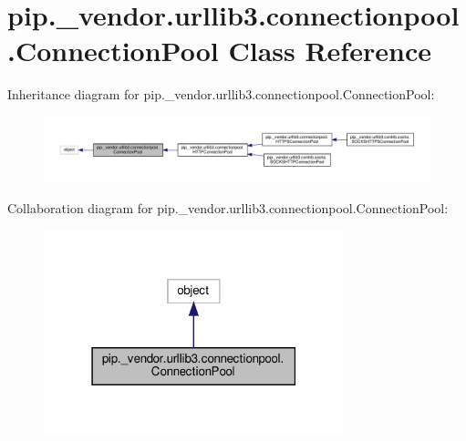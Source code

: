 \hypertarget{classpip_1_1__vendor_1_1urllib3_1_1connectionpool_1_1ConnectionPool}{}\section{pip.\+\_\+vendor.\+urllib3.\+connectionpool.\+Connection\+Pool Class Reference}
\label{classpip_1_1__vendor_1_1urllib3_1_1connectionpool_1_1ConnectionPool}


Inheritance diagram for pip.\+\_\+vendor.\+urllib3.\+connectionpool.\+Connection\+Pool\+:
\nopagebreak
\begin{figure}[H]
\begin{center}
\leavevmode
\includegraphics[width=350pt]{classpip_1_1__vendor_1_1urllib3_1_1connectionpool_1_1ConnectionPool__inherit__graph}
\end{center}
\end{figure}


Collaboration diagram for pip.\+\_\+vendor.\+urllib3.\+connectionpool.\+Connection\+Pool\+:
\nopagebreak
\begin{figure}[H]
\begin{center}
\leavevmode
\includegraphics[width=247pt]{classpip_1_1__vendor_1_1urllib3_1_1connectionpool_1_1ConnectionPool__coll__graph}
\end{center}
\end{figure}
